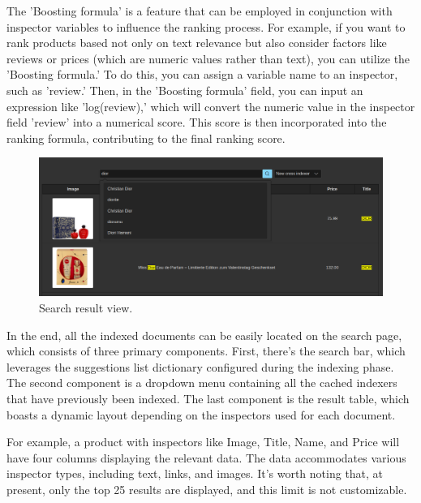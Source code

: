 The 'Boosting formula' is a feature that can be employed in conjunction with inspector variables to influence the ranking process. For example, if you want to rank products based not only on text relevance but also consider factors like reviews or prices (which are numeric values rather than text), you can utilize the 'Boosting formula.' To do this, you can assign a variable name to an inspector, such as 'review.' Then, in the 'Boosting formula' field, you can input an expression like 'log(review),' which will convert the numeric value in the inspector field 'review' into a numerical score. This score is then incorporated into the ranking formula, contributing to the final ranking score.

\begin{figure}[h]	
     \centering
     \includegraphics[width=13cm]{figures/demo-12.png}
     \caption{Search result view.}
     \label{fig:search-result-view}
\end{figure}

In the end, all the indexed documents can be easily located on the search page, which consists of three primary components. First, there's the search bar, which leverages the suggestions list dictionary configured during the indexing phase. The second component is a dropdown menu containing all the cached indexers that have previously been indexed. The last component is the result table, which boasts a dynamic layout depending on the inspectors used for each document.

For example, a product with inspectors like Image, Title, Name, and Price will have four columns displaying the relevant data. The data accommodates various inspector types, including text, links, and images. It's worth noting that, at present, only the top 25 results are displayed, and this limit is not customizable.